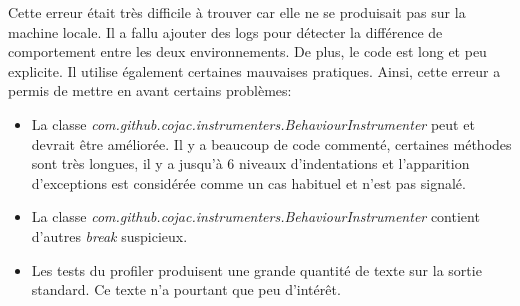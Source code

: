 Cette erreur était très difficile à trouver car elle ne se produisait pas sur la machine locale. Il a fallu ajouter des logs pour détecter la différence de comportement entre les deux environnements. De plus, le code est long et peu explicite. Il utilise également certaines mauvaises pratiques. Ainsi, cette erreur a permis de mettre en avant certains problèmes:

\begin{itemize}
    \item La classe \textit{com.github.cojac.instrumenters.BehaviourInstrumenter} peut et devrait être améliorée. Il y a beaucoup de code commenté, certaines méthodes sont très longues, il y a jusqu'à 6 niveaux d'indentations et l'apparition d'exceptions est considérée comme un cas habituel et n'est pas signalé.
    \item La classe \textit{com.github.cojac.instrumenters.BehaviourInstrumenter} contient d'autres \textit{break} suspicieux.
    \item Les tests du profiler produisent une grande quantité de texte sur la sortie standard. Ce texte n'a pourtant que peu d'intérêt.
\end{itemize}